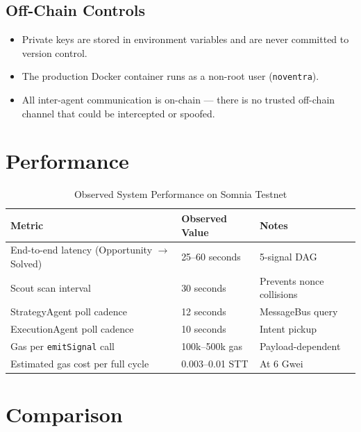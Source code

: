\documentclass[11pt,a4paper]{article}
\begin{document}
\subsection{Off-Chain Controls}

\begin{itemize}[leftmargin=1.8em]
  \item Private keys are stored in environment variables and are never committed to version
        control.
  \item The production Docker container runs as a non-root user (\texttt{noventra}).
  \item All inter-agent communication is on-chain --- there is no trusted off-chain channel
        that could be intercepted or spoofed.
\end{itemize}

\section{Performance}

\begin{table}[H]
\centering
\caption{Observed System Performance on Somnia Testnet}
\begin{tabular}{@{}lll@{}}
  \toprule
  \textbf{Metric} & \textbf{Observed Value} & \textbf{Notes} \\
  \midrule
  End-to-end latency (Opportunity $\to$ Solved) & 25--60 seconds & 5-signal DAG \\
  Scout scan interval & 30 seconds & Prevents nonce collisions \\
  StrategyAgent poll cadence & 12 seconds & MessageBus query \\
  ExecutionAgent poll cadence & 10 seconds & Intent pickup \\
  Gas per \texttt{emitSignal} call & 100k--500k gas & Payload-dependent \\
  Estimated gas cost per full cycle & 0.003--0.01 STT & At 6 Gwei \\
  \bottomrule
\end{tabular}
\end{table}

\section{Comparison}
\end{document}
